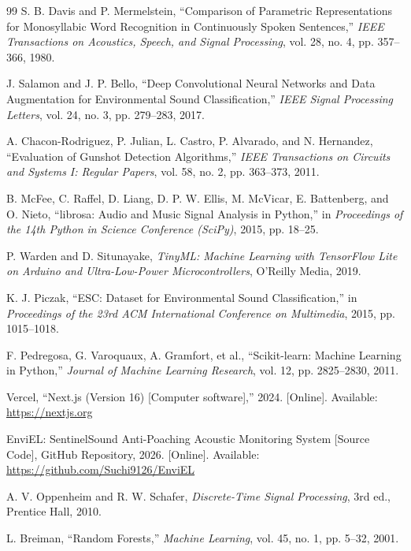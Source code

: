 \documentclass[11pt,a4paper,oneside]{report}
\begin{document}
\begin{thebibliography}{99}
S. B. Davis and P. Mermelstein, ``Comparison of Parametric Representations for Monosyllabic Word Recognition in Continuously Spoken Sentences,'' \textit{IEEE Transactions on Acoustics, Speech, and Signal Processing}, vol. 28, no. 4, pp. 357--366, 1980.

J. Salamon and J. P. Bello, ``Deep Convolutional Neural Networks and Data Augmentation for Environmental Sound Classification,'' \textit{IEEE Signal Processing Letters}, vol. 24, no. 3, pp. 279--283, 2017.

A. Chacon-Rodriguez, P. Julian, L. Castro, P. Alvarado, and N. Hernandez, ``Evaluation of Gunshot Detection Algorithms,'' \textit{IEEE Transactions on Circuits and Systems I: Regular Papers}, vol. 58, no. 2, pp. 363--373, 2011.

B. McFee, C. Raffel, D. Liang, D. P. W. Ellis, M. McVicar, E. Battenberg, and O. Nieto, ``librosa: Audio and Music Signal Analysis in Python,'' in \textit{Proceedings of the 14th Python in Science Conference (SciPy)}, 2015, pp. 18--25.

P. Warden and D. Situnayake, \textit{TinyML: Machine Learning with TensorFlow Lite on Arduino and Ultra-Low-Power Microcontrollers}, O'Reilly Media, 2019.

K. J. Piczak, ``ESC: Dataset for Environmental Sound Classification,'' in \textit{Proceedings of the 23rd ACM International Conference on Multimedia}, 2015, pp. 1015--1018.

F. Pedregosa, G. Varoquaux, A. Gramfort, et al., ``Scikit-learn: Machine Learning in Python,'' \textit{Journal of Machine Learning Research}, vol. 12, pp. 2825--2830, 2011.

Vercel, ``Next.js (Version 16) [Computer software],'' 2024. [Online]. Available: \url{https://nextjs.org}

EnviEL: SentinelSound Anti-Poaching Acoustic Monitoring System [Source Code], GitHub Repository, 2026. [Online]. Available: \url{https://github.com/Suchi9126/EnviEL}

A. V. Oppenheim and R. W. Schafer, \textit{Discrete-Time Signal Processing}, 3rd ed., Prentice Hall, 2010.

L. Breiman, ``Random Forests,'' \textit{Machine Learning}, vol. 45, no. 1, pp. 5--32, 2001.


\end{thebibliography}
\end{document}
